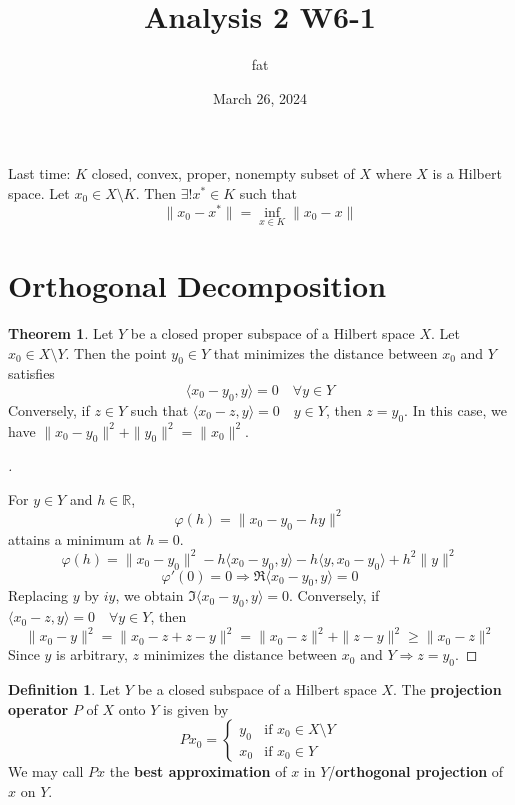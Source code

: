 \documentclass{article}
\title{Analysis 2 W6-1}
\author{fat}
\date{March 26, 2024}
\theoremstyle{definition}
\newtheorem{thm}{Theorem}
\newtheorem{dfn}{Definition}
\newenvironment{proofs}[1][\proofname]{%
  \begin{proof}[#1]$ $\par\nobreak\ignorespaces
}{%
  \end{proof}
}
\begin{document}
\maketitle
\thispagestyle{fancy}
\renewcommand{\footrulewidth}{0.4pt}
\cfoot{\thepage}
\renewcommand{\headrulewidth}{0.4pt}

Last time: 
$K$ closed, convex, proper, nonempty subset of $X$ where $X$ is a Hilbert space.
Let $x_0 \in X \setminus K$.
Then $\exists ! x^* \in K$ such that
\[
	\|x_0 - x^*\| = \inf_{x \in K} \|x_0 - x\|
\]

\section{Orthogonal Decomposition}

\begin{thm}
	Let $Y$ be a closed proper subspace of a Hilbert space $X$.
	Let $x_0 \in X \setminus Y$.
	Then the point $y_0 \in Y$ that minimizes the distance between $x_0$ and $Y$ satisfies
	\[
		\langle x_0 - y_0 , y \rangle = 0 \quad \forall y \in Y
	\]
	Conversely, if $z \in Y$ such that $\langle x_0 - z, y \rangle = 0 \quad y \in Y$, then $z = y_0$.
	In this case, we have $\|x_0 - y_0\|^2 + \|y_0\|^2 = \|x_0\|^2$.
\end{thm}

\begin{proofs}
	For $y \in Y$ and $h \in \mathbb{R}$, 
	\[
		\varphi(h) = \|x_0 - y_0 - hy\|^2
	\]
	attains a minimum at $h = 0$.
	\[
		\varphi(h) = \|x_0 - y_0\|^2 - h \langle x_0 - y_0 , y \rangle - h \langle y, x_0 - y_0 \rangle + h^2 \|y\|^2
	\]
	\[
		\varphi'(0) = 0 \Rightarrow \Re \langle x_0 - y_0, y \rangle = 0
	\]
	Replacing $y$ by $iy$, we obtain $\Im \langle x_0 - y_0, y \rangle = 0$.
	Conversely, if $\langle x_0 - z, y \rangle = 0 \quad \forall y \in Y$, then 
	\[
		\|x_0 - y\|^2 = \|x_0 - z + z - y\|^2 = \|x_0 - z\|^2 + \|z - y\|^2 \geq \|x_0 - z\|^2
	\]
	Since $y$ is arbitrary, $z$ minimizes the distance between $x_0$ and $Y \Rightarrow z = y_0$.
\end{proofs}

\begin{dfn}
	Let $Y$ be a closed subspace of a Hilbert space $X$.
	The \textbf{projection operator} $P$ of $X$ onto $Y$ is given by
	\[
		P x_0 = 
		\begin{cases}
			y_0 & \text{if } x_0 \in X \setminus Y\\
			x_0 & \text{if } x_0 \in Y
		\end{cases}
	\]
	We may call $Px$ the \textbf{best approximation} of $x$ in $Y$/\textbf{orthogonal projection} of $x$ on $Y$.
\end{dfn}
\end{document}
